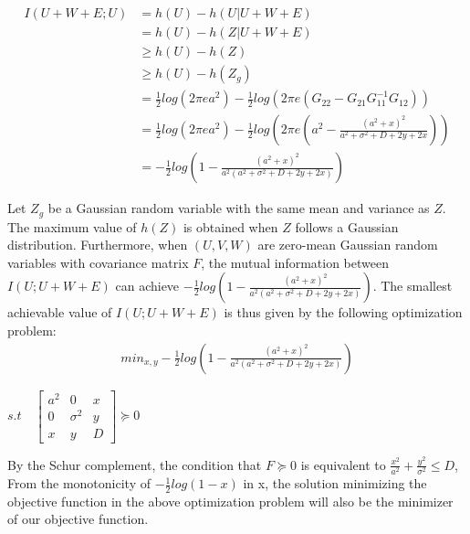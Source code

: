 \documentclass[paper=a4, fontsize=11pt]{scrartcl}
\numberwithin{equation}{section}		%
\numberwithin{figure}{section}			%
\numberwithin{table}{section}				%
\begin{document}
\begin{align}
    I(U+W+E;U) &= h(U) - h(U|U+W+E) \\
    &= h(U) - h(Z|U+W+E) \\
    &\geq h(U) - h(Z) \\
    &\geq h(U) - h(Z_g) \\
     &=\frac{1}{2} log(2\pi e a^2) - \frac{1}{2} log(2\pi e(G_{22} - G_{21}G_{11}^{-1}G_{12})) \\
     &=\frac{1}{2} log(2\pi e a^2) - \frac{1}{2} log(2\pi e (a^2 - \frac{(a^2+x)^2}{a^2+\sigma^2+D+2y+2x}))\\
     &= - \frac{1}{2} log(1 - \frac{(a^2+x)^2}{a^2(a^2+\sigma^2+D+2y+2x)}) 
\end{align}

Let $Z_g$ be a Gaussian random variable with the same mean and variance as $Z$. The maximum value of $h(Z)$ is obtained when $Z$ follows a Gaussian distribution. Furthermore, when $(U, V, W)$ are zero-mean Gaussian random variables with covariance matrix $F$, the mutual information between $I(U; U + W + E)$ can achieve $- \frac{1}{2} log(1 - \frac{(a^2+x)^2}{a^2(a^2+\sigma^2+D+2y+2x)}) $. The smallest achievable value
of $I(U; U + W + E)$ is thus given by the following optimization problem:\\
\begin{align}
   min_{x, y} - \frac{1}{2} log(1 - \frac{(a^2+x)^2}{a^2(a^2+\sigma^2+D+2y+2x)}) 
\end{align}

\begin{center}
  $s.t \quad 
  \begin{bmatrix}
    a^2 & 0 & x\\
    0 & \sigma^2 & y\\
    x & y & D
    \end{bmatrix}
     \succeq 0$  
\end{center}

By the Schur complement, the condition that $F\succeq 0$ is equivalent to $\frac{x^2}{a^2} + \frac{y^2}{\sigma^2} \leq D$, From the monotonicity of $- \frac{1}{2} log(1-x)$ in x, the solution minimizing the objective function in the above optimization problem will also be the minimizer of our objective function.
\end{document}
